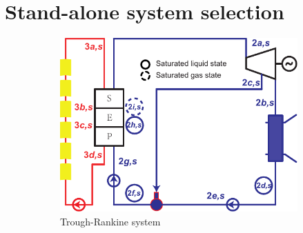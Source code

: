 %

\section{Stand-alone system selection}

\noindent \begin{figure}[htbp]
\centering
	\begin{subfigure}[b]{0.63\columnwidth}
	\includegraphics[width = \columnwidth]{fig/Trough-s}
	\caption{Trough-Rankine system}\label{fig:TroughRankine}
	\end{subfigure}
	~
\begin{subfigure}[b]{0.266\columnwidth}

\end{subfigure}
\end{figure}
